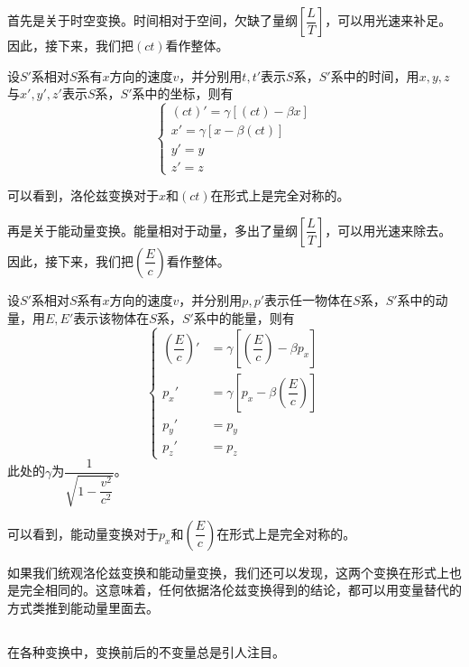 首先是关于时空变换。时间相对于空间，欠缺了量纲$\left[\dfrac{L}{T}\right]$，可以用光速来补足。因此，接下来，我们把$(ct)$看作整体。
\begin{law}
	设$S'$系相对$S$系有$x$方向的速度$v$，并分别用$t,t'$表示$S$系，$S'$系中的时间，用$x,y,z$与$x',y',z'$表示$S$系，$S'$系中的坐标，则有
	\[\left\{\begin{array}{l}
		(ct)'=\gamma[(ct)-\beta x]\\
		x'=\gamma[x-\beta(ct)]\\
		y'=y\\
		z'=z
	\end{array}\right.\]
\end{law}

可以看到，洛伦兹变换对于$x$和$(ct)$在形式上是完全对称的。

再是关于能动量变换。能量相对于动量，多出了量纲$\left[\dfrac{L}{T}\right]$，可以用光速来除去。因此，接下来，我们把$\left(\dfrac{E}{c}\right)$看作整体。
\begin{law}
	设$S'$系相对$S$系有$x$方向的速度$v$，并分别用$p,p'$表示任一物体在$S$系，$S'$系中的动量，用$E,E'$表示该物体在$S$系，$S'$系中的能量，则有
	\[\left\{\begin{aligned}
		\left(\dfrac{E}{c}\right)'&=\gamma\left[\left(\dfrac{E}{c}\right)-\beta p_x\right]\\
		p_x'&=\gamma\left[p_x-\beta\left(\dfrac{E}{c}\right)\right]\\
		p_y'&=p_y\\
		p_z'&=p_z
	\end{aligned}\right.\]
	此处的$\gamma$为$\dfrac{1}{\sqrt{1-\dfrac{v^2}{c^2}}}$。
\end{law}

可以看到，能动量变换对于$p_x$和$\left(\dfrac{E}{c}\right)$在形式上是完全对称的。

如果我们统观洛伦兹变换和能动量变换，我们还可以发现，这两个变换在形式上也是完全相同的。这意味着，任何依据洛伦兹变换得到的结论，都可以用变量替代的方式类推到能动量里面去。
\subsection[不变量]{}
在各种变换中，变换前后的不变量总是引人注目。

